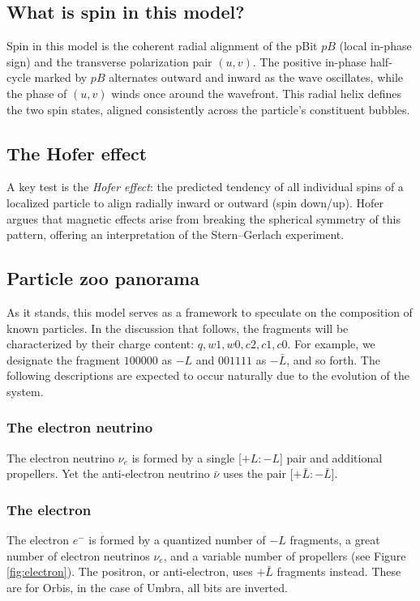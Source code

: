 \documentclass{ijuc}
\begin{document}
\subsection{What is spin in this model?}
Spin in this model is the coherent radial alignment of the pBit $pB$ (local in-phase sign) and the transverse polarization pair $(u,v)$. The positive in-phase half-cycle marked by $pB$ alternates outward and inward as the wave oscillates, while the phase of $(u,v)$ winds once around the wavefront. This radial helix defines the two spin states, aligned consistently across the particle's constituent bubbles.

\subsection{The Hofer effect}\label{subsec:hofer}

A key test is the \emph{Hofer effect}: the predicted tendency of all individual spins of a localized particle to align radially inward or outward (spin down/up). Hofer \cite{hofer} argues that magnetic effects arise from breaking the spherical symmetry of this pattern, offering an interpretation of the Stern–Gerlach experiment.

\subsection{Particle zoo panorama}
As it stands, this model serves as a framework to speculate on the composition of known particles. 
In the discussion that follows, the fragments will be characterized by their charge content: \(q, w1, w0, c2, c1, c0\). 
For example, we designate the fragment \(100000\) as \(-L\) and \(001111\) as \(-\bar{L}\), and so forth. 
The following descriptions are expected to occur naturally due to the evolution of the system.

\subsubsection{The electron neutrino}
The electron neutrino $\nu_e$ is formed by a single [$+L:-L$] pair and additional propellers. 
Yet the anti-electron neutrino $\bar{\nu}$ uses the pair [$+\bar{L}:-\bar{L}$].

\subsubsection{The electron}
The electron $e^-$ is formed by a quantized number of $-L$ fragments, a great number of electron neutrinos $\nu_e$, and a variable number of propellers (see Figure \ref{fig:electron}). The positron, or anti-electron, uses $+\bar{L}$ fragments instead. These are for Orbis, in the case of Umbra, all bits are inverted.
\end{document}
